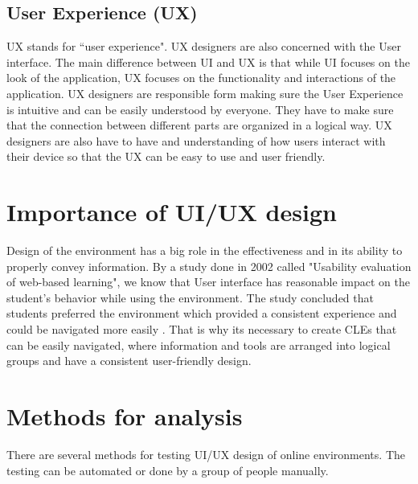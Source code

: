 \documentclass[10pt,twoside,english,a4paper]{article}
\begin{document}
\subsection{User Experience (UX)}
UX stands for ``user experience". UX designers are also concerned with the User interface. \cite{theymakedesign_2019_what}
The main difference between UI and UX is that while UI focuses on the look of the application,
UX focuses on the functionality and interactions of the application. UX designers are 
responsible form making sure the User Experience is intuitive and can be easily understood by everyone.
They have to make sure that the connection between different parts are organized in a logical way.
UX designers are also have to have and understanding of how users interact with their
device so that the UX can be easy to use and user friendly. \cite{theymakedesign_2019_what}

\section{Importance of UI/UX design}\label{importance}
Design of the environment has a big role in the effectiveness and in 
its ability to properly convey information. \cite{ui/ux}
By a study done in 2002 called "Usability evaluation of web-based learning", we know that User interface
has reasonable impact on the student's behavior while using the environment.\cite{wesson_2002_usability}
The study concluded that students preferred the environment which provided a consistent experience and could be navigated more easily
\cite{wesson_2002_usability}. That is why its necessary to create CLEs that can be easily navigated,
where information and tools are arranged into logical groups and have a consistent user-friendly design.




\section{Methods for analysis}\label{methods}
There are several methods for testing UI/UX design of online environments. The testing 
can be automated or done by a group of people manually.
\end{document}
